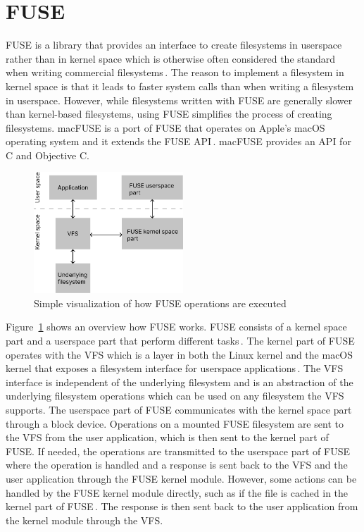 \section{FUSE}
\gls{FUSE} is a library that provides an interface to create filesystems in userspace rather than in kernel space which is otherwise often considered the standard when writing commercial filesystems\,\cite{Libfuse2021}. The reason to implement a filesystem in kernel space is that it leads to faster system calls than when writing a filesystem in userspace. However, while filesystems written with \gls{FUSE} are generally slower than kernel-based filesystems, using \gls{FUSE} simplifies the process of creating filesystems. macFUSE is a port of \gls{FUSE} that operates on Apple's macOS operating system and it extends the \gls{FUSE} \gls{API}\,\cite{HomeMacFUSE}. macFUSE provides an \gls{API} for C and Objective C.

\begin{figure}[!ht]
	\begin{center}
	  \includegraphics[width=0.5\textwidth]{figures/fuse_description.png}
	\end{center}
	\caption{Simple visualization of how \gls{FUSE} operations are executed}
	\label{fig:fuse_desc}
\end{figure}

Figure~\ref{fig:fuse_desc} shows an overview how \gls{FUSE} works. \gls{FUSE} consists of a kernel space part and a userspace part that perform different tasks\,\cite{vangoorFUSENotFUSE2017}. The kernel part of \gls{FUSE} operates with the \gls{VFS} which is a layer in both the Linux kernel and the macOS kernel that exposes a filesystem interface for userspace applications\,\cite{goochOverviewLinuxVirtual, singhMacOSInternals2006}. The \gls{VFS} interface is independent of the underlying filesystem and is an abstraction of the underlying filesystem operations which can be used on any filesystem the \gls{VFS} supports. The userspace part of \gls{FUSE} communicates with the kernel space part through a block device. Operations on a mounted \gls{FUSE} filesystem are sent to the \gls{VFS} from the user application, which is then sent to the kernel part of \gls{FUSE}. If needed, the operations are transmitted to the userspace part of \gls{FUSE} where the operation is handled and a response is sent back to the \gls{VFS} and the user application through the \gls{FUSE} kernel module. However, some actions can be handled by the \gls{FUSE} kernel module directly, such as if the file is cached in the kernel part of \gls{FUSE}\,\cite{vangoorFUSENotFUSE2017}. The response is then sent back to the user application from the kernel module through the \gls{VFS}.